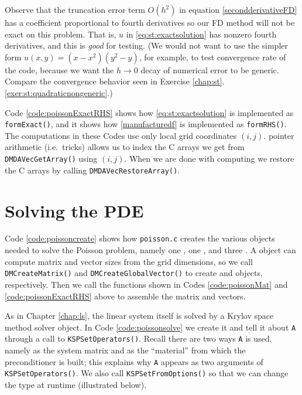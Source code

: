 Observe that the truncation error term $O(h^2)$ in equation \eqref{secondderivativeFD} has a coefficient proportional to fourth derivatives \citep{MortonMayers2005} so our FD method will not be exact on this problem.  That is, $u$ in \eqref{eq:st:exactsolution} has nonzero fourth derivatives, and this is \emph{good} for testing.  (We would not want to use the simpler form $u(x,y)=(x-x^2)(y^2-y)$, for example, to test convergence rate of the code, because we want the $h\to 0$ decay of numerical error to be generic.  Compare the convergence behavior seen in Exercise \ref{chap:st}.\ref{exer:st:quadraticnongeneric}.)

Code \ref{code:poissonExactRHS} shows how \eqref{eq:st:exactsolution} is implemented as \texttt{formExact()}, and it shows how \eqref{manufacturedf} is implemented as \texttt{formRHS()}.  The computations in these Codes use only local grid coordinates $(i,j)$.  \PETSc pointer arithmetic (i.e.~tricks) allows us to index the C arrays we get from \texttt{DMDAVecGetArray()} using $(i,j)$.  When we are done with computing \pVecs we restore the C arrays by calling \texttt{DMDAVecRestoreArray()}.



\section{Solving the PDE}

Code \ref{code:poissoncreate} shows how \texttt{poisson.c} creates the various objects needed to solve the Poisson problem, namely one \pDM, one \pMat, and three \pVecs.  A \pDM object can compute matrix and vector sizes from the grid dimensions, so we call \texttt{DMCreateMatrix()} and \texttt{DMCreateGlobalVector()} to create \pMat and \pVec objects, respectively.  Then we call the functions shown in Codes \ref{code:poissonMat} and \ref{code:poissonExactRHS} above to assemble the matrix and vectors.


As in Chapter \ref{chap:ls}, the linear system itself is solved by a \pKSP Krylov space method solver object.  In Code \ref{code:poissonsolve} we create it and tell it about \pMat \texttt{A} through a call to \texttt{KSPSetOperators()}.  Recall there are two ways \texttt{A} is used, namely as the system matrix and as the ``material'' from which the preconditioner is built; this explains why \texttt{A} appears as two arguments of \texttt{KSPSetOperators()}.  We also call \texttt{KSPSetFromOptions()} so that we can change the \pKSP type at runtime (illustrated below).

